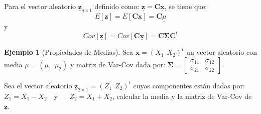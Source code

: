 \documentclass[
]{book}
\theoremstyle{definition}
\theoremstyle{definition}
\newtheorem{example}{Ejemplo}[chapter]
\theoremstyle{definition}
\theoremstyle{definition}
\theoremstyle{remark}
\begin{document}
Para el vector aleatorio \(\underline{\mathbf{z}}_{q\times 1}\) definido como: \(\underline{\mathbf{z}}=\mathbf{C}\underline{\mathbf{x}}\), se tiene que:
\[
E[\underline{\mathbf{z}}]=E[\mathbf{C}\underline{\mathbf{x}}]
=\mathbf{C}\underline{\mu}
\]
y
\[
Cov[\underline{\mathbf{z}}]=Cov[\mathbf{C}\underline{\mathbf{x}}]
=\mathbf{C} \mathbf{\Sigma} \mathbf{C}^t
\]

\begin{example}[Propiedades de Medias]
\protect\hypertarget{exm:ejemplo-prop}{}\label{exm:ejemplo-prop}Sea \(\underline{\mathbf{x}}=(X_1 \ \ X_2)^t\)-un vector aleatorio con media \(\underline{\mu}=(\mu_1 \ \ \mu_2)\) y matriz de Var-Cov dada por:
\(\mathbf{\Sigma}=\begin{bmatrix} \sigma_{11} & \sigma_{12}\\ \sigma_{21} & \sigma_{22} \end{bmatrix}\).

Sea el vector aleatorio \(\underline{\mathbf{z}}_{2\times 1}=(Z_1 \ \ Z_2)^t\) cuyas componentes están dadas por: \(Z_1=X_1-X_2\)~~y ~~ \(Z_2=X_1+X_2\), calcular la media y la matriz de Var-Cov de \(\underline{\mathbf{z}}\).

\color{red}{Solución:}


\end{example}
\end{document}
